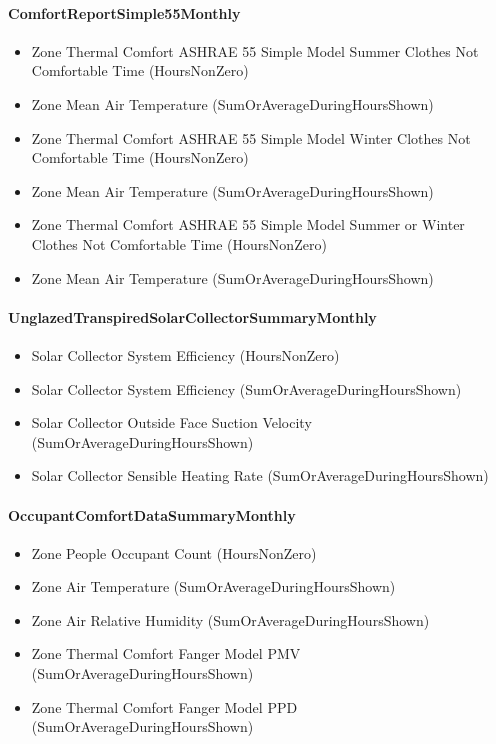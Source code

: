 \paragraph{ComfortReportSimple55Monthly}\label{comfortreportsimple55monthly}

\begin{itemize}
\item
  Zone Thermal Comfort ASHRAE 55 Simple Model Summer Clothes Not Comfortable Time (HoursNonZero)
\item
  Zone Mean Air Temperature (SumOrAverageDuringHoursShown)
\item
  Zone Thermal Comfort ASHRAE 55 Simple Model Winter Clothes Not Comfortable Time (HoursNonZero)
\item
  Zone Mean Air Temperature (SumOrAverageDuringHoursShown)
\item
  Zone Thermal Comfort ASHRAE 55 Simple Model Summer or Winter Clothes Not Comfortable Time (HoursNonZero)
\item
  Zone Mean Air Temperature (SumOrAverageDuringHoursShown)
\end{itemize}

\paragraph{UnglazedTranspiredSolarCollectorSummaryMonthly}\label{unglazedtranspiredsolarcollectorsummarymonthly}

\begin{itemize}
\item
  Solar Collector System Efficiency (HoursNonZero)
\item
  Solar Collector System Efficiency (SumOrAverageDuringHoursShown)
\item
  Solar Collector Outside Face Suction Velocity (SumOrAverageDuringHoursShown)
\item
  Solar Collector Sensible Heating Rate (SumOrAverageDuringHoursShown)
\end{itemize}

\paragraph{OccupantComfortDataSummaryMonthly}\label{occupantcomfortdatasummarymonthly}

\begin{itemize}
\item
  Zone People Occupant Count (HoursNonZero)
\item
  Zone Air Temperature (SumOrAverageDuringHoursShown)
\item
  Zone Air Relative Humidity (SumOrAverageDuringHoursShown)
\item
  Zone Thermal Comfort Fanger Model PMV (SumOrAverageDuringHoursShown)
\item
  Zone Thermal Comfort Fanger Model PPD (SumOrAverageDuringHoursShown)
\end{itemize}

